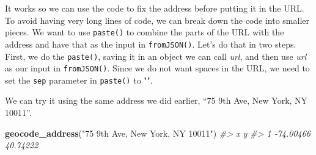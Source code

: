 \documentclass[
  12pt,
]{book}
\newenvironment{Shaded}{\begin{snugshade}}{\end{snugshade}}
\newcommand{\CommentTok}[1]{\textcolor[rgb]{0.37,0.37,0.37}{\textit{#1}}}
\newcommand{\ControlFlowTok}[1]{\textcolor[rgb]{0.27,0.27,0.27}{\textbf{#1}}}
\newcommand{\DataTypeTok}[1]{\textcolor[rgb]{0.27,0.27,0.27}{#1}}
\newcommand{\DecValTok}[1]{\textcolor[rgb]{0.06,0.06,0.06}{#1}}
\newcommand{\KeywordTok}[1]{\textcolor[rgb]{0.27,0.27,0.27}{\textbf{#1}}}
\newcommand{\NormalTok}[1]{#1}
\newcommand{\OperatorTok}[1]{\textcolor[rgb]{0.43,0.43,0.43}{\textbf{#1}}}
\newcommand{\StringTok}[1]{\textcolor[rgb]{0.5,0.5,0.5}{#1}}
\begin{document}
It works so we can use the code to fix the address before putting it in the URL. To avoid having very long lines of code, we can break down the code into smaller pieces. We want to use \texttt{paste()} to combine the parts of the URL with the address and have that as the input in \texttt{fromJSON()}. Let's do that in two steps. First, we do the \texttt{paste()}, saving it in an object we can call \emph{url}, and then use \emph{url} as our input in \texttt{fromJSON()}. Since we do not want spaces in the URL, we need to set the \texttt{sep} parameter in \texttt{paste()} to "".

\begin{Shaded}
\end{Shaded}

We can try it using the same address we did earlier, ``75 9th Ave, New York, NY 10011''.

\begin{Shaded}
\begin{Highlighting}[]
\KeywordTok{geocode\_address}\NormalTok{(}\StringTok{"75 9th Ave, New York, NY 10011"}\NormalTok{)}
\CommentTok{\#>           x        y}
\CommentTok{\#> 1 {-}74.00466 40.74222}
\end{Highlighting}
\end{Shaded}
\end{document}
